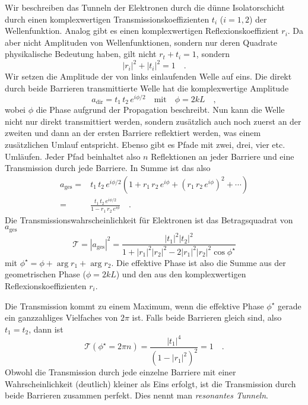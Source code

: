 Wir beschreiben das  Tunneln der Elektronen durch die dünne Isolatorschicht  durch einen komplexwertigen Transmissionskoeffizienten $t_i$ ($i=1,2$) der Wellenfunktion. Analog gibt es einen komplexwertigen Reflexionskoeffizient $r_i$. Da aber nicht Amplituden von Wellenfunktionen, sondern nur deren Quadrate physikalische Bedeutung haben, gilt nicht $r_t + t_i =1$, sondern
\begin{equation}
    |r_i|^2 + |t_i|^2 = 1 \quad .
\end{equation}
Wir setzen die Amplitude der von links einlaufenden Welle auf eins. Die direkt durch beide Barrieren transmittierte Welle hat die komplexwertige Amplitude
\begin{equation}
    a_\text{dir} = t_1 \, t_2 \, e^{i \phi/2} \quad \text{mit} \quad \phi = 2 k L \quad ,
\end{equation}
wobei $\phi$ die Phase aufgrund der Propagation beschreibt. Nun kann die Welle nicht nur direkt transmittiert werden, sondern zusätzlich auch noch zuerst an der zweiten und dann an der ersten Barriere reflektiert werden, was einem zusätzlichen Umlauf entspricht. Ebenso gibt es Pfade mit zwei, drei, vier etc. Umläufen. Jeder Pfad beinhaltet also $n$ Reflektionen an jeder Barriere und  eine Transmission durch jede Barriere. In Summe ist das also
\begin{align}
    a_\text{ges} = & t_1 \, t_2 \, e^{i \phi/2} \left( 1 + r_1 \, r_2 \,  e^{i \phi} 
    + (r_1 \, r_2 \,  e^{i \phi} )^2 + \cdots  \right) \\
     = & \frac{ t_1 \, t_2 \, e^{i \phi/2}}{1 - r_1 \, r_2 \,  e^{i \phi} } \quad .
\end{align}
Die Transmissionswahrscheinlichkeit  für Elektronen ist das Betragsquadrat von $ a_\text{ges}$
\begin{equation}
    \mathcal{T} = |  a_\text{ges} |^2 = \frac{|t_1|^2  |t_2|^2 }{1 + |r_1|^2  |r_2|^2 - 2 |r_1|^2  |r_2|^2 \cos \phi^\star}
\end{equation}
mit $\phi^\star = \phi  + \arg r_1 + \arg r_2$. Die effektive Phase ist also die Summe aus der geometrischen Phase ($\phi = 2 k L $) und den aus den komplexwertigen Reflexionskoeffizienten $r_i$.

Die Transmission kommt zu einem Maximum, wenn die effektive Phase $\phi^\star$ gerade ein ganzzahliges Vielfaches von $2\pi$ ist. Falls beide Barrieren gleich  sind, also $t_1 = t_2$, dann ist 
\begin{equation}
    \mathcal{T} (\phi^\star = 2 \pi n) =\frac{|t_1|^4}{ (1- |r_1|^2)^2} = 1 \quad .
\end{equation}
Obwohl die Transmission durch jede einzelne Barriere mit einer Wahrscheinlichkeit (deutlich) kleiner als Eins erfolgt, ist die Transmission durch beide Barrieren zusammen perfekt. Dies nennt man \emph{resonantes Tunneln}.


